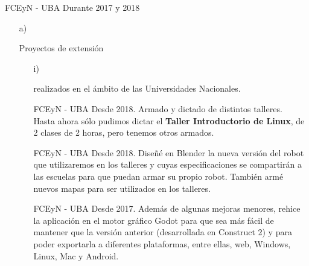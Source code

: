 \begin{itemize}[leftmargin=0.5cm]
{FCEyN - UBA}
{Durante 2017 y 2018}{}
\end{itemize}

\begin{enumerate}[leftmargin=0.8cm]

  \item[a)]{Proyectos de extensión

    \begin{itemize}[leftmargin=0.2cm]

      \item[i)]{realizados en el ámbito de las Universidades Nacionales.

        \begin{itemize}[leftmargin=0.2cm]

          {FCEyN - UBA}
          {Desde 2018.}
          {Armado y dictado de distintos talleres. \\
          Hasta ahora sólo pudimos dictar el \textbf{Taller Introductorio de Linux}, de 2 clases de 2 horas, pero tenemos otros armados.}

          {FCEyN - UBA}
          {Desde 2018.}
          {Diseñé en Blender la nueva versión del robot que utilizaremos en los talleres y cuyas
            especificaciones se compartirán a las escuelas para que puedan armar su propio robot.
            También armé nuevos mapas para ser utilizados en los talleres.}

          {FCEyN - UBA}
          {Desde 2017.}
          {Además de algunas mejoras menores, rehice la aplicación en el motor gráfico Godot para
            que sea más fácil de mantener que la versión anterior (desarrollada en Construct 2) y
            para poder exportarla a diferentes plataformas, entre ellas, web, Windows, Linux, Mac y Android.}


\end{itemize}}
\end{itemize}}
\end{enumerate}
